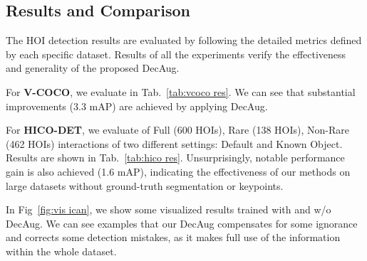 \documentclass[10pt,twocolumn,letterpaper]{article}
\begin{document}
\begin{figure*}[tb!]
\centering


\vfill

\caption{HOI detection results of iCAN trained with (top) and w/o (bottom) DecAug. DecAug brings more accurate detection.}
\label{fig:vis ican}
\end{figure*}

\subsection{Results and Comparison}
\label{sec:exp}


The HOI detection results are evaluated by following the detailed metrics defined by each specific dataset. Results of all the experiments verify the effectiveness and generality of the proposed DecAug.

For \textbf{V-COCO}, we evaluate  in Tab.~\ref{tab:vcoco res}. We can see that substantial improvements (3.3 mAP) are achieved by applying DecAug.

For \textbf{HICO-DET}, we evaluate  of Full (600 HOIs), Rare (138 HOIs), Non-Rare (462 HOIs) interactions of two different settings: Default and Known Object. Results are shown in Tab.~\ref{tab:hico res}. Unsurprisingly, notable performance gain is also achieved (1.6 mAP), indicating the effectiveness of our methods on large datasets without ground-truth segmentation or keypoints.

In Fig~\ref{fig:vis ican}, we show some visualized results trained with and w/o DecAug. We can see examples that our DecAug compensates for some ignorance and corrects some detection mistakes, as it makes full use of the information within the whole dataset.
\end{document}
